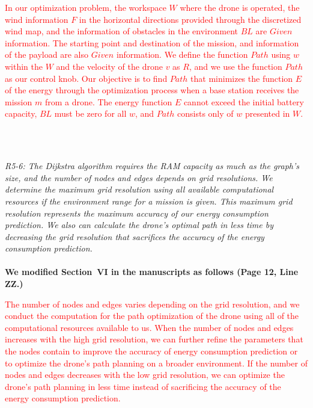\documentclass[onecolumn]{IEEEconf}
\begin{document}
\begin{description}
\begin{mdframed}[ linewidth=.75pt, userdefinedwidth=0.9\textwidth]
    \textcolor{red}{In our optimization problem, the workspace $W$ where the drone is operated, the wind information $F$ in the horizontal directions provided through the discretized wind map, and the information of obstacles in the environment $BL$ are $Given$ information.
    The starting point and destination of the mission, and information of the payload are also $Given$ information.
    We define the function $Path$ using $w$ within the $W$ and the velocity of the drone $v$ as $R$, and we use the function $Path$ as our control knob.
    Our objective is to find $Path$ that minimizes the function $E$ of the energy through the optimization process when a base station receives the mission $m$ from a drone.
    The energy function $E$ cannot exceed the initial battery capacity, $BL$ must be zero for all $w$, and $Path$ consists only of $w$ presented in $W$.}
    \end{mdframed}
    ~\\
    ~\\
	\item \textit
	{
	R5-6: The Dijkstra algorithm requires the RAM capacity as much as the graph's size, and the number of nodes and edges depends on grid resolutions.
    We determine the maximum grid resolution using all available computational resources if the environment range for a mission is given.
    This maximum grid resolution represents the maximum accuracy of our energy consumption prediction.
    We also can calculate the drone's optimal path in less time by decreasing the grid resolution that sacrifices the accuracy of the energy consumption prediction.
	}
	~\\
    ~\\
    \textbf{We modified Section~VI in the manuscripts as follows (Page 12, Line ZZ.)}\\
    \begin{mdframed}[ linewidth=.75pt, userdefinedwidth=0.9\textwidth]
    \textcolor{red}{
    The number of nodes and edges varies depending on the grid resolution, and we conduct the computation for the path optimization of the drone using all of the computational resources available to us. When the number of nodes and edges increases with the high grid resolution, we can further refine the parameters that the nodes contain to improve the accuracy of energy consumption prediction or to optimize the drone’s path planning on a broader environment.
    If the number of nodes and edges decreases with the low grid resolution, we can optimize the drone’s path planning in less time instead of sacrificing the accuracy of the energy consumption prediction.}

\end{mdframed}
\end{description}
\end{document}
